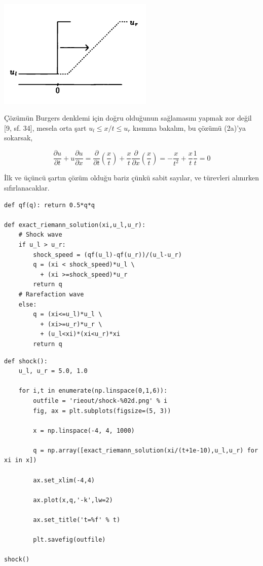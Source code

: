 \documentclass[12pt,fleqn]{article}\usepackage{../../common}
\begin{document}
\includegraphics[width=20em]{compscieng_bpp50fv1_02.png}

Çözümün Burgers denklemi için doğru olduğunun sağlamasını yapmak zor değil
[9, sf. 34], mesela orta şart $u_l \le x/t \le u_r $ kısmına bakalım,
bu çözümü (2a)'ya sokarsak,

$$
\frac{\partial u}{\partial t} + u \frac{\partial u}{\partial x} =
\frac{\partial }{\partial t} \left( \frac{x}{t}  \right) +
\frac{x}{t} \frac{\partial }{\partial x} \left( \frac{x}{t}  \right) =
-\frac{x}{t^2} + \frac{x}{t} \frac{1}{t} = 0
$$

İlk ve üçüncü şartın çözüm olduğu bariz çünkü sabit sayılar, ve türevleri
alınırken sıfırlanacaklar.

\begin{verbatim}
def qf(q): return 0.5*q*q
    
def exact_riemann_solution(xi,u_l,u_r):
    # Shock wave
    if u_l > u_r: 
        shock_speed = (qf(u_l)-qf(u_r))/(u_l-u_r)
        q = (xi < shock_speed)*u_l \
          + (xi >=shock_speed)*u_r
        return q
    # Rarefaction wave
    else:  
        q = (xi<=u_l)*u_l \
          + (xi>=u_r)*u_r \
          + (u_l<xi)*(xi<u_r)*xi
        return q
\end{verbatim}

\begin{verbatim}
def shock():
    u_l, u_r = 5.0, 1.0

    for i,t in enumerate(np.linspace(0,1,6)):
        outfile = 'rieout/shock-%02d.png' % i
        fig, ax = plt.subplots(figsize=(5, 3))
                    
        x = np.linspace(-4, 4, 1000)
        
        q = np.array([exact_riemann_solution(xi/(t+1e-10),u_l,u_r) for xi in x])

        ax.set_xlim(-4,4)

        ax.plot(x,q,'-k',lw=2)

        ax.set_title('t=%f' % t)
    
        plt.savefig(outfile)

shock() 
\end{verbatim}
\end{document}
